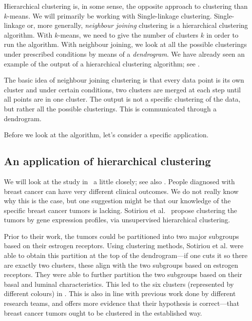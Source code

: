 \documentclass[a4paper, 12pt]{article}
\numberwithin{equation}{section}
\numberwithin{figure}{section}
\theoremstyle{definition}
\begin{document}
Hierarchical clustering is, in some sense, the opposite approach to clustering
than $k$-means. We will primarily be working with Single-linkage clustering.
Single-linkage or, more generally, \emph{neighbour joining} clustering is a
hierarchical clustering algorithm. With $k$-means, we need to give the number of
clusters $k$ in order to run the algorithm. With neighbour joining, we look at
all the possible clusterings under prescribed conditions by means of a
\emph{dendrogram}. We have already seen an example of the output of a
hierarchical clustering algorithm; see .

The basic idea of neighbour joining clustering is that every data point is its
own cluster and under certain conditions, two clusters are merged at each step
until all points are in one cluster. The output is not a specific clustering of
the data, but rather all the possible clusterings. This is communicated through
a dendrogram. 

Before we look at the algorithm, let's consider a specific application.

\subsection{An application of hierarchical clustering}

We will look at the study in~\cite{BreastCancer} a little closely; see also
. People diagnosed with breast cancer can have very
different clinical outcomes. We do not really know why this is the case, but one
suggestion might be that our knowledge of the specific breast cancer tumors is
lacking. Sotiriou et al.~\cite{BreastCancer} propose clustering the tumors by
gene expression profiles, via unsupervised hierarchical clustering. 

Prior to their work, the tumors could be partitioned into two major subgroups
based on their estrogen receptors. Using clustering methods, Sotiriou et al.
were able to obtain this partition at the top of the dendrogram---if one cuts it
so there are exactly two clusters, these align with the two subgroups based on
estrogen receptors. They were able to further partition the two subgroups based
on their basal and luminal characteristics. This led to the six clusters
(represented by different colours) in . This is also
in line with previous work done by different research teams, and offers more
evidence that their hypothesis is correct---that breast cancer tumors ought to
be clustered in the established way.
\end{document}
